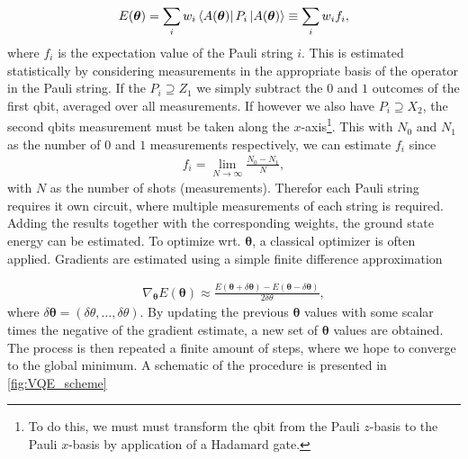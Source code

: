 \begin{align*}
    E(\boldsymbol{\theta}) = \sum_i w_i\bra{A(\boldsymbol{\theta})} P_i \ket{A(\boldsymbol{\theta})} \equiv \sum_i w_i f_i,
\end{align*}
where $f_i$ is the expectation value of the Pauli string $i$. This is estimated statistically by considering measurements in the appropriate basis of the operator in the Pauli string. If the $P_i \supseteq Z_1$ we simply subtract the $0$ and $1$ outcomes of the first qbit, averaged over all measurements. If however we also have $P_i \supseteq X_2$, the second qbits measurement must be taken along the $x$-axis\footnote{To do this, we must must transform the qbit from the Pauli $z$-basis to the Pauli $x$-basis by application of a Hadamard gate.}. This with $N_0$ and $N_1$ as the number of $0$ and $1$ measurements respectively, we can estimate $f_i$ since 
\begin{align*}
    f_i = \lim_{N \to \infty} \frac{N_0 - N_1}{N},
\end{align*}
with $N$ as the number of shots (measurements). Therefor each Pauli string requires it own circuit, where multiple measurements of each string is required. Adding the results together with the corresponding weights, the ground state energy can be estimated. To optimize wrt. $\boldsymbol{\theta}$, a classical optimizer is often applied. Gradients are estimated using a simple finite difference approximation

\begin{align}
    \nabla_{\boldsymbol{\theta}} E(\boldsymbol{\theta}) \approx \frac{E(\boldsymbol{\theta} + \delta \boldsymbol{\theta})-E(\boldsymbol{\theta} - \delta \boldsymbol{\theta})}{2\delta \theta} ,
\end{align}
where $\delta \boldsymbol{\theta} = (\delta \theta, \ldots, \delta \theta)$. By updating the previous $\boldsymbol{\theta}$ values with some scalar times the negative of the gradient estimate, a new set of $\boldsymbol{\theta}$ values are obtained. The process is then repeated a finite amount of steps, where we hope to converge to the global minimum. A schematic of the procedure is presented in \cref{fig:VQE_scheme}

